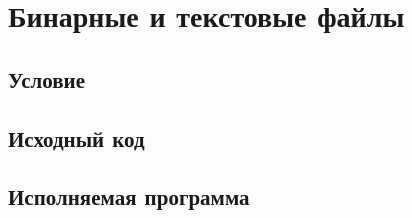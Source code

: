 \documentclass[12pt, a4paper]{article}
\begin{document}
\section{Бинарные и текстовые файлы}
    \subsection{Условие}
        

    \newpage
    \subsection{Исходный код}
        

    \newpage
    \subsection{Исполняемая программа}
        

    \labconclusion{}

\newpage

\end{document}
